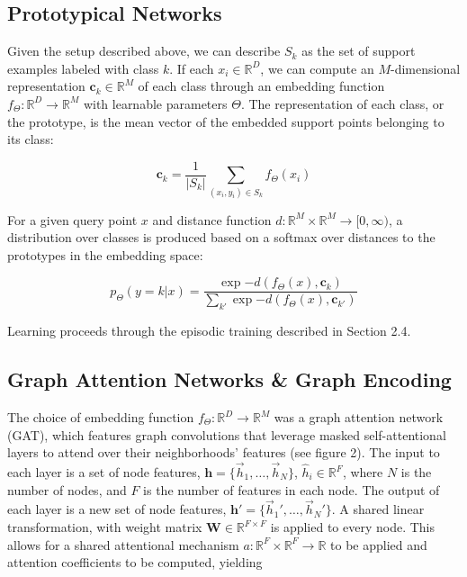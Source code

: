 \documentclass{article}
\begin{document}
\subsection{Prototypical Networks}

Given the setup described above, we can describe $S_k$ as the set of support examples labeled with class $k$.  If each $x_i \in \mathbb{R}^D$, we can compute an $M$-dimensional representation $\textbf{c}_k \in \mathbb{R}^M$ of each class through an embedding function $f_\Theta : \mathbb{R}^D \to \mathbb{R}^M$ with learnable parameters $\Theta$.  The representation of each class, or the prototype, is the mean vector of the embedded support points belonging to its class:


    $$\textbf{c}_k = \frac{1}{|S_k|}\sum_{\left(x_i,y_i\right) \in S_k}f_\Theta\left(x_i\right)$$


For a given query point $x$ and distance function $d : \mathbb{R}^M \times \mathbb{R}^M \to [0, \infty)$, a distribution over classes is produced based on a softmax over distances to the prototypes in the embedding space:

    $$p_\Theta\left(y = k | x\right) = \frac{\exp{-d\left(f_\Theta\left(x\right), \textbf{c}_k\right)}}{\sum_{k'}\exp{-d\left(f_\Theta\left(x\right), \textbf{c}_{k'}\right)}}$$
    
Learning proceeds through the episodic training described in Section 2.4.

\subsection{Graph Attention Networks \& Graph Encoding}
The choice of embedding function $f_\Theta : \mathbb{R}^D \to \mathbb{R}^M$ was a graph attention network (GAT), which features graph convolutions that leverage masked self-attentional layers to attend over their neighborhoods' features (see figure 2).  The input to each layer is a set of node features, $\textbf{h} = \{\vec{h}_1,\ldots,\vec{h}_N\}$, $\hat{h}_i \in \mathbb{R}^F$, where $N$ is the
number of nodes, and $F$ is the number of features in each node.  The output of each layer is a new set of node features, $\textbf{h}' = \{\vec{h}_1',\ldots,\vec{h}_N'\}$.  A shared linear transformation, with weight matrix $\textbf{W} \in \mathbb{R}^{F\times F}$ is applied to every node.  This allows for a shared attentional mechanism $a : \mathbb{R}^{F} \times \mathbb{R}^{F} \to \mathbb{R}$ to be applied and attention coefficients to be computed, yielding
\end{document}
